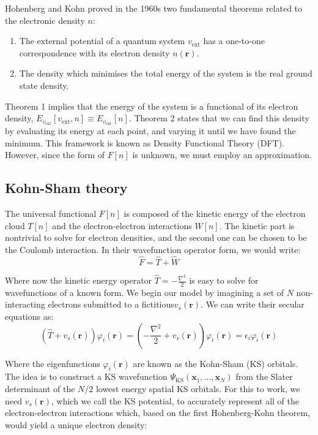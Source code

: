 Hohenberg and Kohn proved in the 1960s two fundamental theorems related to the electronic density $n$:\cite{Hohenberg1964}
 \begin{enumerate}
     \item The external potential of a quantum system $v_{\text{ext}}$ has a one-to-one correspondence with its electron density $n(\bm{r})$.
     \item The density which minimises the total energy of the system is the real ground state density.
 \end{enumerate}

Theorem 1 implies that the energy of the system is a functional of its electron density, $E_{v_{\text{ext}}}[v_{\text{ext}},n] \equiv E_{v_{\text{ext}}}[n]$. Theorem 2 states that we can find this density by evaluating its energy at each point, and varying it until we have found the minimum. This framework is known as Density Functional Theory (DFT). However, since the form of $F[n]$ is unknown, we must employ an approximation.

\subsection{Kohn-Sham theory}
The universal functional $F[n]$ is composed of the kinetic energy of the electron cloud $T[n]$ and the electron-electron interactions $W[n]$. The kinetic part is nontrivial to solve for electron densities, and the second one can be chosen to be the Coulomb interaction. In their wavefunction operator form, we would write:
\begin{equation}
    \hat{F}=\hat{T}+\hat{W}
\end{equation}

Where now the kinetic energy operator $\hat{T} = - \frac{\nabla^2}{2}$ is easy to solve for wavefunctions of a known form. We begin our model by imagining a set of $N$ non-interacting electrons submitted to a fictitious$v_s(\bm{r})$. We can write their secular equations as:\cite{Sham1965}
\begin{equation}
    (\hat{T} + v_s(\bm{r})) \varphi_i (\bm{r}) = (- \frac{\nabla^2}{2} + v_s(\bm{r})) \varphi_i (\bm{r}) = \epsilon_i \varphi_i (\bm{r})
    \label{eq:ks1}
\end{equation}
 
Where the eigenfunctions $\varphi_i (\bm{r})$ are known as the Kohn-Sham (KS) orbitals. The idea is to construct a KS wavefunction $\Psi_{\text{KS}}(\bm{x}_1,\ldots,\bm{x}_N)$ from the Slater determinant of the $N/2$ lowest energy spatial KS orbitals. For this to work, we need $v_s(\bm{r})$, which we call the KS potential, to accurately represent all of the electron-electron interactions which, based on the first Hohenberg-Kohn theorem, would yield a unique electron density:

